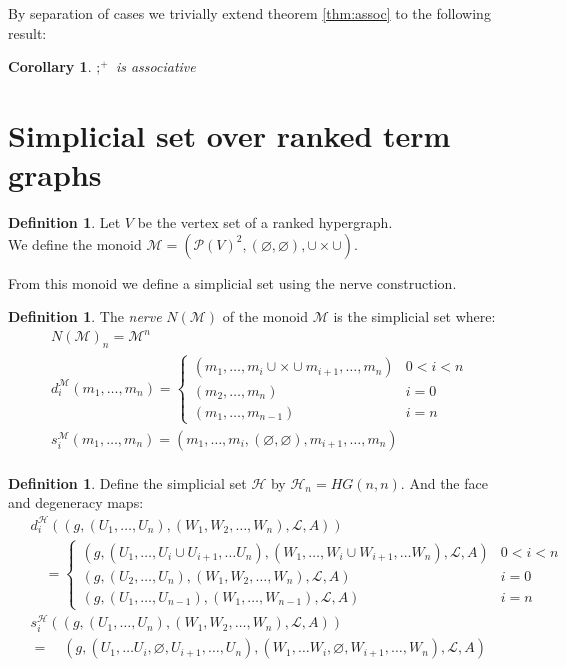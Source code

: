 \documentclass[12pt]{article}
\newtheorem{corollary}[theorem]{Corollary}
\theoremstyle{definition}
\newtheorem{definition}[theorem]{Definition}
\renewcommand{\P}{\mathcal{P}}
\newcommand{\1}{\mathbbm{1}}
\renewcommand{\L}{\mathcal{L}}
\newcommand{\M}{\mathcal{M}}
\renewcommand{\H}{\mathcal{H}}
\newcommand{\seq}{;}
\begin{document}
By separation of cases we trivially extend theorem \ref{thm:assoc} to the following result:
\begin{corollary}
    $\seq^+$ is associative
\end{corollary}

\section{Simplicial set over ranked term graphs}
\begin{definition}
    Let $V$ be the vertex set of a ranked hypergraph.\\
    We define the monoid $\M = (\P(V)^2, (\varnothing, \varnothing), \cup\times\cup)$. 
\end{definition}

From this monoid we define a simplicial set using the nerve construction.

\begin{definition}
    The \emph{nerve} $N(\M)$ of the monoid $\M$ is the simplicial set where:
    \begin{align*}
        N(\M)_n = \M^n\\
        d^{\M}_i(m_1,\dots,m_n) = 
        \begin{cases}
            (m_1,\dots,m_i \cup\times\cup m_{i+1}, \dots, m_n) & 0 < i < n\\
            (m_2,\dots, m_n) & i = 0\\
            (m_1,\dots,m_{n-1}) & i = n
        \end{cases}\\
        s^{\M}_i(m_1,\dots,m_n) = (m_1, \dots, m_i, (\varnothing, \varnothing), m_{i+1}, \dots, m_n)\\
    \end{align*}
\end{definition}

\begin{definition}
Define the simplicial set $\H$ by $\H_n = HG(n,n)$. And the face and degeneracy maps:
\begin{align*}
    &d_i^{\H} ((g, (U_1, \dots, U_n), (W_1, W_2, \dots, W_n), \L, A))\\
    &\quad=\begin{cases}
        (g, (U_1, \dots, U_i\cup U_{i+1}, \dots U_n), (W_1, \dots, W_i\cup W_{i+1}, \dots W_n), \L, A) & 0 < i < n\\
        (g, (U_2, \dots, U_n), (W_1, W_2, \dots, W_n), \L, A) & i = 0\\
        (g, (U_1, \dots, U_{n-1}), (W_1, \dots, W_{n-1}), \L, A) & i = n
    \end{cases}\\
    \hspace{5pt}
    &s_i^{\H}((g, (U_1, \dots, U_n), (W_1, W_2, \dots, W_n), \L, A))\\
    &=\quad (g, (U_1, \dots U_i, \varnothing, U_{i+1}, \dots, U_n), (W_1, \dots W_i, \varnothing, W_{i+1}, \dots, W_n), \L, A)
\end{align*}
\end{definition}
\end{document}
